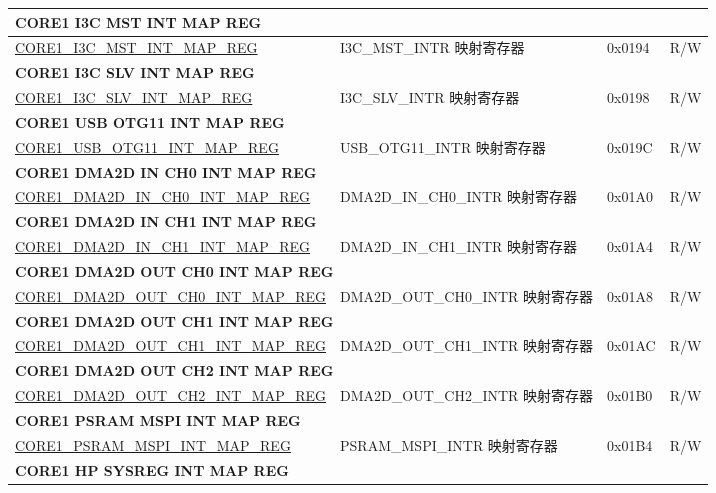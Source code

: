 \begin{longtable}{ | p{7.5cm} | p{7.2cm} | p{1.3cm} | p{1cm} | }
\multicolumn{4}{|l|}{\textbf{CORE1 I3C MST INT MAP REG}} \\ \hline
\hyperref[regdesc:CORE1I3CMSTINTMAPREG]{CORE1\_I3C\_MST\_INT\_MAP\_REG} & I3C\_MST\_INTR 映射寄存器 & 0x0194 & R/W \\ \hline
\multicolumn{4}{|l|}{\textbf{CORE1 I3C SLV INT MAP REG}} \\ \hline
\hyperref[regdesc:CORE1I3CSLVINTMAPREG]{CORE1\_I3C\_SLV\_INT\_MAP\_REG} & I3C\_SLV\_INTR 映射寄存器 & 0x0198 & R/W \\ \hline
\multicolumn{4}{|l|}{\textbf{CORE1 USB OTG11 INT MAP REG}} \\ \hline
\hyperref[regdesc:CORE1USBOTG11INTMAPREG]{CORE1\_USB\_OTG11\_INT\_MAP\_REG} & USB\_OTG11\_INTR 映射寄存器 & 0x019C & R/W \\ \hline
\multicolumn{4}{|l|}{\textbf{CORE1 DMA2D IN CH0 INT MAP REG}} \\ \hline
\hyperref[regdesc:CORE1DMA2DINCH0INTMAPREG]{CORE1\_DMA2D\_IN\_CH0\_INT\_MAP\_REG} & DMA2D\_IN\_CH0\_INTR 映射寄存器 & 0x01A0 & R/W \\ \hline
\multicolumn{4}{|l|}{\textbf{CORE1 DMA2D IN CH1 INT MAP REG}} \\ \hline
\hyperref[regdesc:CORE1DMA2DINCH1INTMAPREG]{CORE1\_DMA2D\_IN\_CH1\_INT\_MAP\_REG} & DMA2D\_IN\_CH1\_INTR 映射寄存器 & 0x01A4 & R/W \\ \hline
\multicolumn{4}{|l|}{\textbf{CORE1 DMA2D OUT CH0 INT MAP REG}} \\ \hline
\hyperref[regdesc:CORE1DMA2DOUTCH0INTMAPREG]{CORE1\_DMA2D\_OUT\_CH0\_INT\_MAP\_REG} & DMA2D\_OUT\_CH0\_INTR 映射寄存器 & 0x01A8 & R/W \\ \hline
\multicolumn{4}{|l|}{\textbf{CORE1 DMA2D OUT CH1 INT MAP REG}} \\ \hline
\hyperref[regdesc:CORE1DMA2DOUTCH1INTMAPREG]{CORE1\_DMA2D\_OUT\_CH1\_INT\_MAP\_REG} & DMA2D\_OUT\_CH1\_INTR 映射寄存器 & 0x01AC & R/W \\ \hline
\multicolumn{4}{|l|}{\textbf{CORE1 DMA2D OUT CH2 INT MAP REG}} \\ \hline
\hyperref[regdesc:CORE1DMA2DOUTCH2INTMAPREG]{CORE1\_DMA2D\_OUT\_CH2\_INT\_MAP\_REG} & DMA2D\_OUT\_CH2\_INTR 映射寄存器 & 0x01B0 & R/W \\ \hline
\multicolumn{4}{|l|}{\textbf{CORE1 PSRAM MSPI INT MAP REG}} \\ \hline
\hyperref[regdesc:CORE1PSRAMMSPIINTMAPREG]{CORE1\_PSRAM\_MSPI\_INT\_MAP\_REG} & PSRAM\_MSPI\_INTR 映射寄存器 & 0x01B4 & R/W \\ \hline
\multicolumn{4}{|l|}{\textbf{CORE1 HP SYSREG INT MAP REG}} \\ \hline

\end{longtable}
